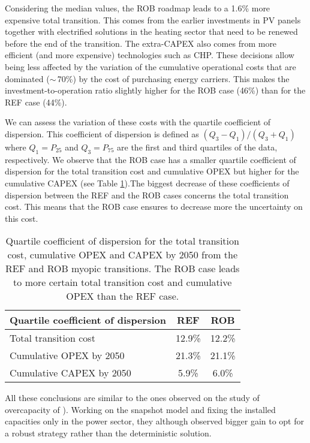 Considering the median values, the ROB roadmap leads to a 1.6\% more expensive total transition. This comes from the earlier investments in \gls{PV} panels together with electrified solutions in the heating sector that need to be renewed before the end of the transition. The extra-\gls{CAPEX} also comes from more efficient (and more expensive) technologies such as \gls{CHP}. These decisions allow being less affected by the variation of the cumulative operational costs that are dominated ($\sim$\,70\%) by the cost of purchasing energy carriers.  This makes the investment-to-operation ratio slightly higher for the ROB case (46\%) than for the REF case (44\%). 

We can assess the variation of these costs with the quartile coefficient of dispersion. This coefficient of dispersion is defined as $\left(Q_3-Q_1 \right)/\left(Q_3+Q_1 \right)$ where $Q_1=P_{25}$ and $Q_3=P_{75}$ are the first and third quartiles of the data, respectively. We observe that the ROB case has a smaller quartile coefficient of dispersion for the total transition cost and cumulative \gls{OPEX} but higher for the cumulative \gls{CAPEX} (see Table \ref{tab:quartile_coeff_dispersion}).The biggest decrease of these coefficients of dispersion between the REF and the ROB cases concerns the total transition cost. This means that the ROB case ensures to decrease more the uncertainty on this cost. 



\begin{table}[htbp!]
\caption{Quartile coefficient of dispersion for the total transition cost, cumulative OPEX and CAPEX by 2050 from the REF and ROB myopic transitions. The ROB case leads to more certain total transition cost and cumulative \gls{OPEX} than the REF case.}
\label{tab:quartile_coeff_dispersion}
\centering
\begin{tabular}{l| c c}
\toprule
\textbf{Quartile coefficient of dispersion} &  REF  & ROB \\
\midrule
Total transition cost & 12.9\% & 12.2\%  \\
Cumulative \gls{OPEX} by 2050 & 21.3\% & 21.1\% \\
Cumulative \gls{CAPEX} by 2050 & 5.9\% & 6.0\%\\
\bottomrule							
\end{tabular}
\end{table}

All these conclusions are similar to the ones observed on the study of overcapacity of \citet{moret2020overcapacity}). Working on the snapshot model and fixing the installed capacities only in the power sector, they although observed bigger gain to opt for a robust strategy rather than the deterministic solution.

